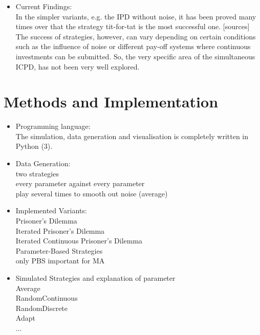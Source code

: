 \documentclass{article}
\begin{document}
\begin{itemize}
	\item Current Findings:\\

In the simpler variants, e.g. the IPD without noise, it has been proved many times over that the strategy tit-for-tat is the most successful one. [sources]
The success of strategies, however, can vary depending on certain conditions such as the influence of noise or different pay-off systems where continuous investments can be submitted.
So, the very specific area of the simultaneous ICPD, has not been very well explored.


\end{itemize}

\section{Methods and Implementation}
\begin{itemize}

	\item Programming language:\\

The simulation, data generation and visualisation is completely written in Python (3).


	\item Data Generation:\\
		two strategies\\
		every parameter against every parameter\\
		play several times to smooth out noise (average)\\

	\item Implemented Variants:\\
		Prisoner's Dilemma\\
		Iterated Prisoner's Dilemma\\
		Iterated Continuous Prisoner's Dilemma\\
		Parameter-Based Strategies\\
		only PBS important for MA\\

	\item Simulated Strategies and explanation of parameter\\
		Average\\
		RandomContinuous\\
		RandomDiscrete\\
		Adapt\\
		...\\

\end{itemize}
\end{document}
